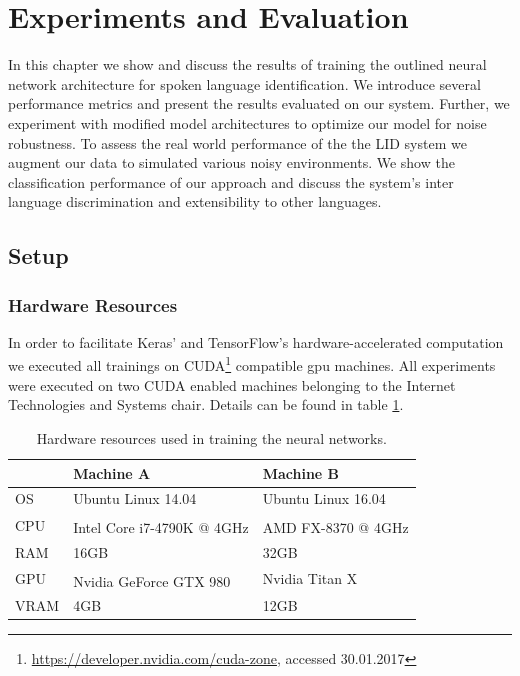 \section{Experiments and Evaluation} 
\label{sec:evaluation}
In this chapter we show and discuss the results of training the outlined neural network architecture for spoken language identification. We introduce several performance metrics and present the results evaluated on our system.
Further, we experiment with modified model architectures to optimize our model for noise robustness. To assess the real world performance of the the LID system we augment our data to simulated various noisy environments. We show the classification performance of our approach and discuss the system's inter language discrimination and extensibility to other languages.     

\subsection{Setup} 
\label{sec:setup}

\subsubsection{Hardware Resources}
\label{sec:hardware}
	In order to facilitate Keras' and TensorFlow's hardware-accelerated computation we executed all trainings on CUDA\footnote{\url{https://developer.nvidia.com/cuda-zone}, accessed 30.01.2017} compatible \ac{gpu} machines. All experiments were executed on two CUDA enabled machines belonging to the Internet Technologies and Systems chair. Details can be found in table \ref{tab:hardware}.
		
	\begin{table}[h]
	\centering
	\begin{tabularx}{\textwidth}{lll}
	\toprule
	  		& Machine A 					& Machine B \\ \midrule
	OS  	& Ubuntu Linux 14.04 		& Ubuntu Linux 16.04 \\
	CPU  	& Intel\textsuperscript{\textregistered} Core\textsuperscript{\texttrademark} i7-4790K @ 4GHz 	& AMD FX\textsuperscript{\texttrademark}-8370  @ 4GHz \\
	RAM  	& 16GB 						& 32GB \\
	GPU  	& Nvidia GeForce\textsuperscript{\textregistered} GTX 980 	& Nvidia Titan X \\
	VRAM  	& 4GB 						& 12GB \\
	\bottomrule
	\end{tabularx}
	\caption{Hardware resources used in training the neural networks.}
	\label{tab:hardware}
	\end{table}

